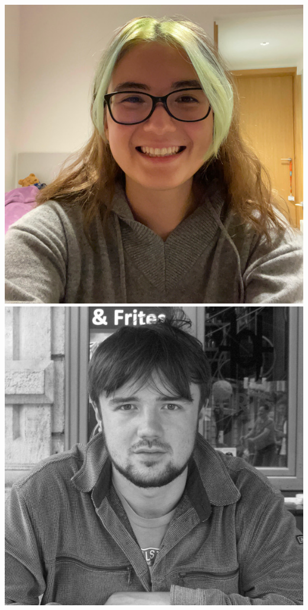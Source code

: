\documentclass[aspectratio=169,handout]{beamer}
\begin{document}
\begin{frame}
{        \includegraphics[width=0.09\textheight]{figures/students/sinah_legner.jpg}%
        \includegraphics[width=0.09\textheight]{figures/students/sam_leeney.jpg}%
}
\end{frame}
\end{document}
